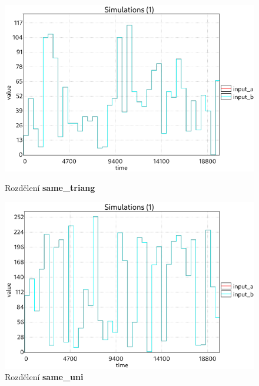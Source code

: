 \begin{figure}[H]
\centering
\begin{minipage}{.5\textwidth}
  \centering
  \includegraphics[width=0.95\linewidth]{obrazky-figures/inputs_same_triang.png}
  \caption{Rozdělení \textbf{same\_triang}}
  \label{fig:inputs_same_triang}
\end{minipage}%
\begin{minipage}{.5\textwidth}
  \centering
  \includegraphics[width=0.95\linewidth]{obrazky-figures/inputs_same_uni.png}
  \caption{Rozdělení \textbf{same\_uni}}
  \label{fig:inputs_same_uni}
\end{minipage}
\end{figure}

